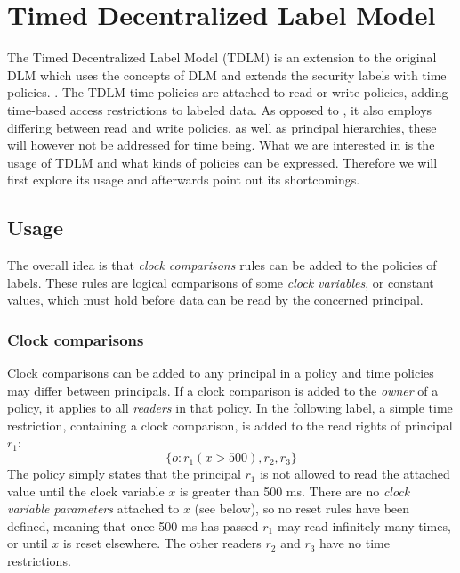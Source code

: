 
\newcommand{\tat}{\;@\;} %
\newcommand{\tdor}{\;||\;} %
\newcommand{\tdand}{\;\&\&\;} %

\section{Timed Decentralized Label Model}
The Timed Decentralized Label Model (TDLM) is an extension to the original DLM which uses the concepts of DLM and extends the security labels with time policies. \cite{pedersen2015}.
The TDLM time policies are attached to read or write policies, adding time-based access restrictions to labeled data.
As opposed to \thetool, it also employs differing between read and write policies, as well as principal hierarchies, these will however not be addressed for time being.
What we are interested in is the usage of TDLM and what kinds of policies can be expressed.
Therefore we will first explore its usage and afterwards point out its shortcomings.

\subsection{Usage}
The overall idea is that \emph{clock comparisons} rules can be added to the policies of labels.
These rules are logical comparisons of some \emph{clock variables}, or constant values, which must hold before data can be read by the concerned principal.

\subsubsection{Clock comparisons}
Clock comparisons can be added to any principal in a policy and time policies may differ between principals.
If a clock comparison is added to the \emph{owner} of a policy, it applies to all \emph{readers} in that policy.
In the following label, a simple time restriction, containing a clock comparison, is added to the read rights of principal $r_1$:
  \[ \{ o : r_1(x > 500), r_2, r_3 \} \]
The policy simply states that the principal $r_1$ is not allowed to read the attached value until the clock variable $x$ is greater than 500 ms.
There are no \emph{clock variable parameters} attached to $x$ (see below), so no reset rules have been defined, meaning that once 500 ms has passed $r_1$ may read infinitely many times, or until $x$ is reset elsewhere.
The other readers $r_2$ and $r_3$ have no time restrictions.

